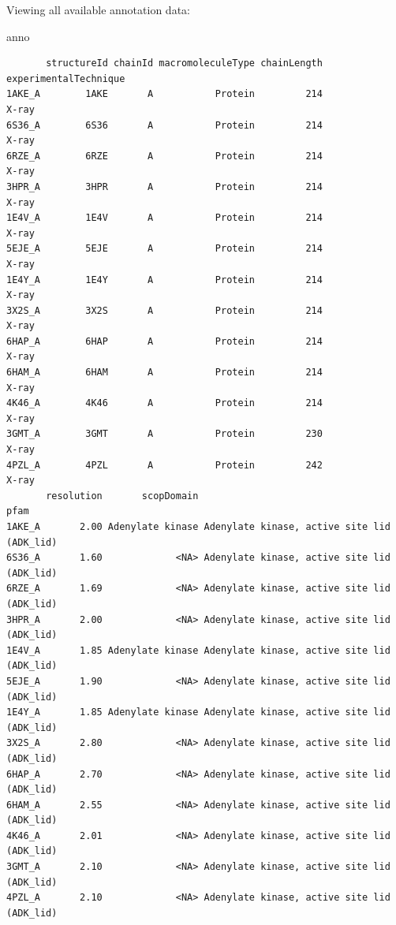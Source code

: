 \documentclass[
  letterpaper,
  DIV=11,
  numbers=noendperiod]{scrartcl}
\newenvironment{Shaded}{\begin{snugshade}}{\end{snugshade}}
\newcommand{\NormalTok}[1]{\textcolor[rgb]{0.00,0.23,0.31}{#1}}
\begin{document}
Viewing all available annotation data:

\begin{Shaded}
\begin{Highlighting}[]
\NormalTok{anno}
\end{Highlighting}
\end{Shaded}

\begin{verbatim}
       structureId chainId macromoleculeType chainLength experimentalTechnique
1AKE_A        1AKE       A           Protein         214                 X-ray
6S36_A        6S36       A           Protein         214                 X-ray
6RZE_A        6RZE       A           Protein         214                 X-ray
3HPR_A        3HPR       A           Protein         214                 X-ray
1E4V_A        1E4V       A           Protein         214                 X-ray
5EJE_A        5EJE       A           Protein         214                 X-ray
1E4Y_A        1E4Y       A           Protein         214                 X-ray
3X2S_A        3X2S       A           Protein         214                 X-ray
6HAP_A        6HAP       A           Protein         214                 X-ray
6HAM_A        6HAM       A           Protein         214                 X-ray
4K46_A        4K46       A           Protein         214                 X-ray
3GMT_A        3GMT       A           Protein         230                 X-ray
4PZL_A        4PZL       A           Protein         242                 X-ray
       resolution       scopDomain                                        pfam
1AKE_A       2.00 Adenylate kinase Adenylate kinase, active site lid (ADK_lid)
6S36_A       1.60             <NA> Adenylate kinase, active site lid (ADK_lid)
6RZE_A       1.69             <NA> Adenylate kinase, active site lid (ADK_lid)
3HPR_A       2.00             <NA> Adenylate kinase, active site lid (ADK_lid)
1E4V_A       1.85 Adenylate kinase Adenylate kinase, active site lid (ADK_lid)
5EJE_A       1.90             <NA> Adenylate kinase, active site lid (ADK_lid)
1E4Y_A       1.85 Adenylate kinase Adenylate kinase, active site lid (ADK_lid)
3X2S_A       2.80             <NA> Adenylate kinase, active site lid (ADK_lid)
6HAP_A       2.70             <NA> Adenylate kinase, active site lid (ADK_lid)
6HAM_A       2.55             <NA> Adenylate kinase, active site lid (ADK_lid)
4K46_A       2.01             <NA> Adenylate kinase, active site lid (ADK_lid)
3GMT_A       2.10             <NA> Adenylate kinase, active site lid (ADK_lid)
4PZL_A       2.10             <NA> Adenylate kinase, active site lid (ADK_lid)

\end{verbatim}
\end{document}
